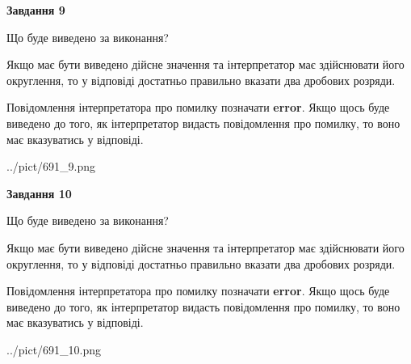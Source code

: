 \documentclass[12pt, ukrainian]{article}
\begin{document}
{\begin {Large}
{\begin {center}\textbf{Завдання 9}\end {center}}\par
Що буде виведено за виконання? \par

Якщо має бути виведено дійсне значення та інтерпретатор має здійснювати його округлення, 
то у відповіді достатньо правильно вказати два дробових розряди.

Повідомлення інтерпретатора про помилку позначати \textbf{error}.
Якщо щось буде виведено до того, як інтерпретатор видасть повідомлення про помилку, 
то воно має вказуватись у відповіді. \par

\begin{center}
	{../pict/691_9.png}
\end{center}
\newpage

{\begin {center}\textbf{Завдання 10}\end {center}}\par
Що буде виведено за виконання? \par

Якщо має бути виведено дійсне значення та інтерпретатор має здійснювати його округлення, 
то у відповіді достатньо правильно вказати два дробових розряди.

Повідомлення інтерпретатора про помилку позначати \textbf{error}.
Якщо щось буде виведено до того, як інтерпретатор видасть повідомлення про помилку, 
то воно має вказуватись у відповіді. \par

\begin{center}
	{../pict/691_10.png}
\end{center}
\newpage

\end {Large}}
\end{document}
